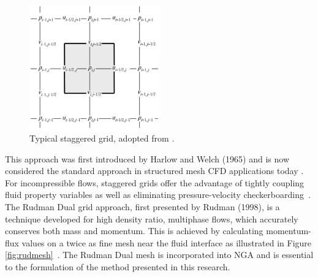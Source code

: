  \begin{figure}[h!]
 	\centering
 	\includegraphics[width=0.5\textwidth]{figs/StaggeredGrid}
 	\caption{Typical staggered grid, adopted from \cite{TRYG}.}
 	\label{fig:StagGrid}
 \end{figure}

\noindent This approach was first introduced by Harlow and Welch (1965) and is now considered the standard approach in structured mesh CFD applications today \cite{HARLOW1965}. For incompressible flows, staggered grids offer the advantage of tightly coupling fluid property variables as well as eliminating pressure-velocity checkerboarding~\cite{rudman}. The Rudman Dual grid approach, first presented by Rudman (1998), is a technique developed for high density ratio, multiphase flows, which accurately conserves both mass and momentum. This is achieved by calculating momentum-flux values on a twice as fine mesh near the fluid interface as illustrated in Figure \ref{fig:rudmesh}~\cite{Rudman}. The Rudman Dual mesh is incorporated into NGA and is essential to the formulation of the method presented in this research. 

